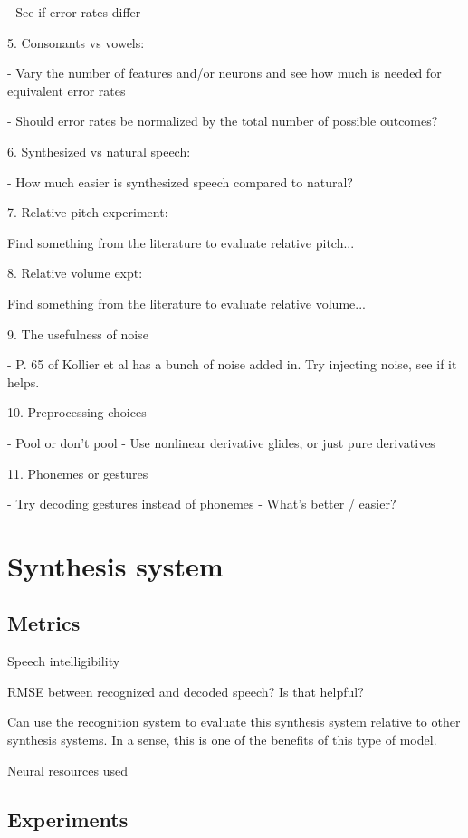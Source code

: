 - See if error rates differ

5. Consonants vs vowels:

- Vary the number of features and/or neurons and see
  how much is needed for equivalent error rates

  - Should error rates be normalized by the total number
    of possible outcomes?

6. Synthesized vs natural speech:

- How much easier is synthesized speech compared to natural?

7. Relative pitch experiment:

Find something from the literature to evaluate relative pitch...

8. Relative volume expt:

Find something from the literature to evaluate relative volume...

9. The usefulness of noise

- P. 65 of Kollier et al has a bunch of noise added in.
  Try injecting noise, see if it helps.

10. Preprocessing choices

- Pool or don't pool
- Use nonlinear derivative glides, or just pure derivatives

11. Phonemes or gestures

- Try decoding gestures instead of phonemes
- What's better / easier?

\section{Synthesis system}

\subsection{Metrics}

Speech intelligibility

RMSE between recognized and decoded speech?
Is that helpful?

Can use the recognition system to evaluate
this synthesis system relative to other
synthesis systems.
In a sense, this is one of the benefits
of this type of model.

Neural resources used

\subsection{Experiments}


